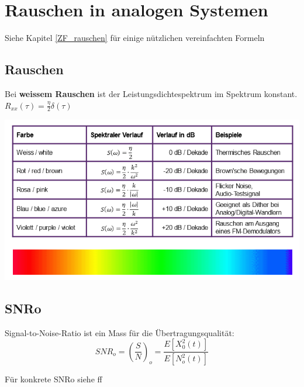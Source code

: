 \section{Rauschen in analogen Systemen}Siehe Kapitel \ref{ZF_rauschen} für einige nützlichen vereinfachten Formeln
\subsection{Rauschen}
Bei \textbf{weissem Rauschen} ist der Leistungsdichtespektrum im Spektrum konstant. $R_{xx}(\tau) = \frac{\eta}{2}\delta(\tau)$

\begin{center}
	\includegraphics[width=\columnwidth]{Images/rauschen}
\end{center}

\subsection{SNRo}
Signal-to-Noise-Ratio ist ein Mass für die Übertragungsqualität:
\[
SNR_o = \left(\frac{S}{N}\right)_o = \frac{E[X_0^2(t)]}{E[N_o^2(t)]}
\]

Für konkrete SNRo siehe ff